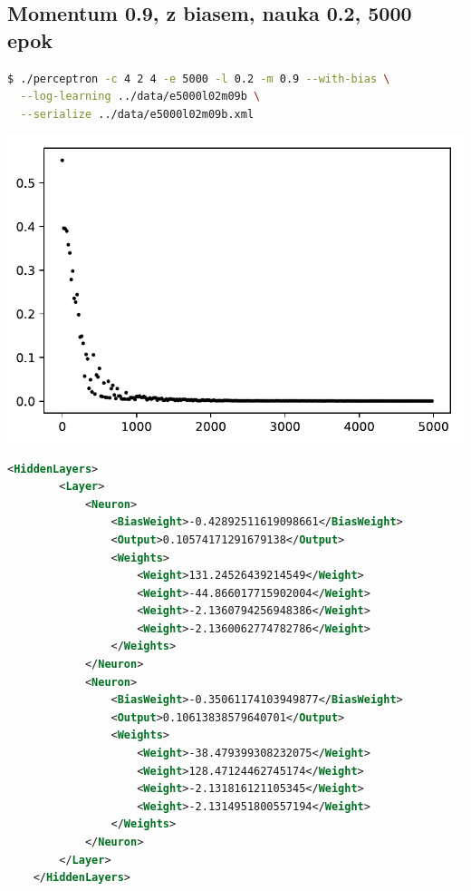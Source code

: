 \documentclass{classrep}
\begin{document}
\subsection{Momentum 0.9, z biasem, nauka 0.2, 5000 epok}
\begin{lstlisting}[language=bash]
$ ./perceptron -c 4 2 4 -e 5000 -l 0.2 -m 0.9 --with-bias \
  --log-learning ../data/e5000l02m09b \
  --serialize ../data/e5000l02m09b.xml
\end{lstlisting}
\begin{center}
 \includegraphics{sprawozdanie/output_0_19.pdf}
\end{center}
\begin{lstlisting}[language=xml]
     <HiddenLayers>
        <Layer>
            <Neuron>
                <BiasWeight>-0.42892511619098661</BiasWeight>
                <Output>0.10574171291679138</Output>
                <Weights>
                    <Weight>131.24526439214549</Weight>
                    <Weight>-44.866017715902004</Weight>
                    <Weight>-2.1360794256948386</Weight>
                    <Weight>-2.1360062774782786</Weight>
                </Weights>
            </Neuron>
            <Neuron>
                <BiasWeight>-0.35061174103949877</BiasWeight>
                <Output>0.10613838579640701</Output>
                <Weights>
                    <Weight>-38.479399308232075</Weight>
                    <Weight>128.47124462745174</Weight>
                    <Weight>-2.131816121105345</Weight>
                    <Weight>-2.1314951800557194</Weight>
                </Weights>
            </Neuron>
        </Layer>
    </HiddenLayers>
\end{lstlisting}
\clearpage
\end{document}

